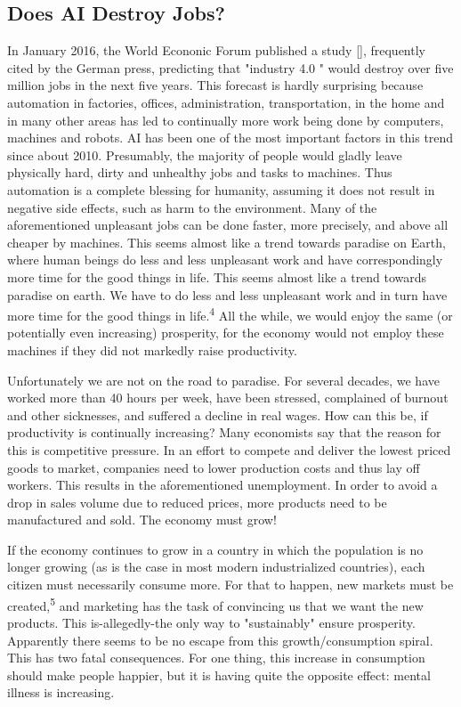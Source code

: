 \documentclass[10pt]{book}
\begin{document}
\subsection{Does AI Destroy Jobs?}
In January 2016, the World Econonic Forum published a study [\cite{schwab2016futurejobs}], frequently cited by the German press, predicting that "industry 4.0 " would destroy over five\\
million jobs in the next five years. This forecast is hardly surprising because automation in factories, offices, administration, transportation, in the home and in many other areas has led to continually more work being done by computers, machines and robots. AI has been one of the most important factors in this trend since about 2010.
Presumably, the majority of people would gladly leave physically hard, dirty and unhealthy jobs and tasks to machines. Thus automation is a complete blessing for humanity, assuming it does not result in negative side effects, such as harm to the environment. Many of the aforementioned unpleasant jobs can be done faster, more precisely, and above all cheaper by machines. This seems almost like a trend towards paradise on Earth, where human beings do less and less unpleasant work and have correspondingly more time for the good things in life. This seems almost like a trend towards paradise on earth. We have to do less and less unpleasant work and in turn have more time for the good things in life.\textsuperscript{4} All the while, we would enjoy the same (or potentially even increasing) prosperity, for the economy would not employ these machines if they did not markedly raise productivity.

Unfortunately we are not on the road to paradise. For several decades, we have worked more than 40 hours per week, have been stressed, complained of burnout and other sicknesses, and suffered a decline in real wages. How can this be, if productivity is continually increasing? Many economists say that the reason for this is competitive pressure. In an effort to compete and deliver the lowest priced goods to market, companies need to lower production costs and thus lay off workers. This results in the aforementioned unemployment. In order to avoid a drop in sales volume due to reduced prices, more products need to be manufactured and sold. The economy must grow!

If the economy continues to grow in a country in which the population is no longer growing (as is the case in most modern industrialized countries), each citizen must necessarily consume more. For that to happen, new markets must be created,\textsuperscript{5} and marketing has the task of convincing us that we want the new products. This is-allegedly-the only way to "sustainably" ensure prosperity. Apparently there seems to be no escape from this growth/consumption spiral. This has two fatal consequences. For one thing, this increase in consumption should make people happier, but it is having quite the opposite effect: mental illness is increasing.
\end{document}
